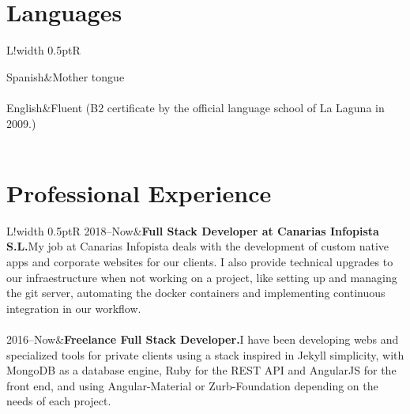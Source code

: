 \documentclass[10pt]{article}
\newcommand\VRule{\color{lightgray}\vrule width 0.5pt}
\begin{document}
    \section*{Languages}
    \begin{tabular}{L!{\VRule}R}

        Spanish&Mother tongue\\\\

        English&Fluent (B2 certificate by the official language school of La Laguna in 2009.)\\\\

    \end{tabular}

    \section*{Professional Experience}
    \begin{tabular}{L!{\VRule}R}
        2018--Now&{{\bf Full Stack Developer at Canarias Infopista S.L.}\newline My job at Canarias Infopista deals with the development of custom native apps and corporate websites for our clients. I also provide technical upgrades to our infraestructure when not working on a project, like setting up and managing the git server, automating the docker containers and implementing continuous integration in our workflow.}\\\\

        2016--Now&{{\bf Freelance Full Stack Developer.}\newline I have been developing webs and specialized tools for private clients using a stack inspired in Jekyll simplicity, with MongoDB as a database engine, Ruby for the REST API and AngularJS for the front end, and using Angular-Material or Zurb-Foundation depending on the needs of each project.}\\\\

    \end{tabular}
\end{document}
